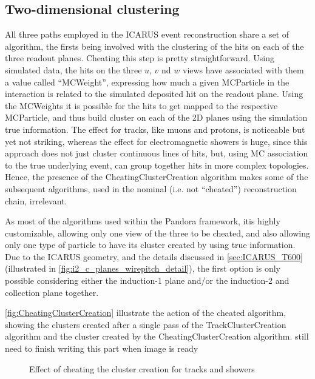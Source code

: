 \subsection{Two-dimensional clustering}

All three paths employed in the ICARUS event reconstruction share a set of algorithm, the firsts being involved with the clustering of the hits on each of the three readout planes. Cheating this step is pretty straightforward. Using simulated data, the hits on the three $u$, $v$ nd $w$ views have associated with them a value called ``MCWeight'', expressing how much a given MCParticle in the interaction is related to the simulated deposited hit on the readout plane. Using the MCWeights it is possible for the hits to get mapped to the respective MCParticle, and thus build cluster on each of the 2D planes using the simulation true information. The effect for tracks, like muons and protons, is noticeable but yet not striking, whereas the effect for electromagnetic showers is huge, since this approach does not just cluster continuous lines of hits, but, using MC association to the true underlying event, can group together hits in more complex topologies. Hence, the presence of the CheatingClusterCreation algorithm makes some of the subsequent algorithms, used in the nominal (i.e. not ``cheated'') reconstruction chain, irrelevant. 

As most of the algorithms used within the Pandora framework, itis highly customizable, allowing only one view of the three to be cheated, and also allowing only one type of particle to have its cluster created by using true information. Due to the ICARUS geometry, and the details discussed in \autoref{sec:ICARUS_T600} (illustrated in \autoref{fig:i2_c_planes_wirepitch_detail}), the first option is only possible considering either the induction-1 plane and/or the induction-2 and collection plane together.

\autoref{fig:CheatingClusterCreation} illustrate the action of the cheated algorithm, showing the clusters created after a single pass of the TrackClusterCreation algorithm and the cluster created by the CheatingClusterCreation algorithm. {\color{red} still need to finish writing this part when image is ready} 

\begin{figure}
    \centering
    \caption[CheatingClusterCreation versus TrackClusterCreation algorithm]{\color{red} Effect of cheating the cluster creation for tracks and showers}
    \label{fig:CheatingClusterCreation}
\end{figure}

